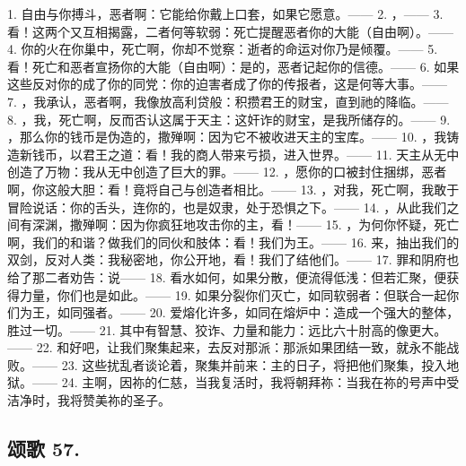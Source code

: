 1. 自由与你搏斗，恶者啊：它能给你戴上口套，如果它愿意。—— 2. ，—— 3. 看！这两个又互相揭露，二者何等软弱：死亡提醒恶者你的大能（自由啊）。—— 4. 你的火在你巢中，死亡啊，你却不觉察：逝者的命运对你乃是倾覆。—— 5. 看！死亡和恶者宣扬你的大能（自由啊）：是的，恶者记起你的信德。—— 6. 如果这些反对你的成了你的同党：你的迫害者成了你的传报者，这是何等大事。—— 7. ，我承认，恶者啊，我像放高利贷般：积攒君王的财宝，直到祂的降临。—— 8. ，我，死亡啊，反而否认这属于天主：这奸诈的财宝，是我所储存的。—— 9. ，那么你的钱币是伪造的，撒殚啊：因为它不被收进天主的宝库。—— 10. ，我铸造新钱币，以君王之道：看！我的商人带来亏损，进入世界。—— 11. 天主从无中创造了万物：我从无中创造了巨大的罪。—— 12. ，愿你的口被封住捆绑，恶者啊，你这般大胆：看！竟将自己与创造者相比。—— 13. ，对我，死亡啊，我敢于冒险说话：你的舌头，连你的，也是奴隶，处于恐惧之下。—— 14. ，从此我们之间有深渊，撒殚啊：因为你疯狂地攻击你的主，看！—— 15. ，为何你怀疑，死亡啊，我们的和谐？做我们的同伙和肢体：看！我们为王。—— 16. 来，抽出我们的双剑，反对人类：我秘密地，你公开地，看！我们了结他们。—— 17. 罪和阴府也给了那二者劝告：说—— 18. 看水如何，如果分散，便流得低浅：但若汇聚，便获得力量，你们也是如此。—— 19. 如果分裂你们灭亡，如同软弱者：但联合一起你们为王，如同强者。—— 20. 爱熔化许多，如同在熔炉中：造成一个强大的整体，胜过一切。—— 21. 其中有智慧、狡诈、力量和能力：远比六十肘高的像更大。—— 22. 和好吧，让我们聚集起来，去反对那派：那派如果团结一致，就永不能战败。—— 23. 这些扰乱者谈论着，聚集并前来：主的日子，将把他们聚集，投入地狱。—— 24. 主啊，因祢的仁慈，当我复活时，我将朝拜祢：当我在祢的号声中受洁净时，我将赞美祢的圣子。\par


\subsection{颂歌 57.}

